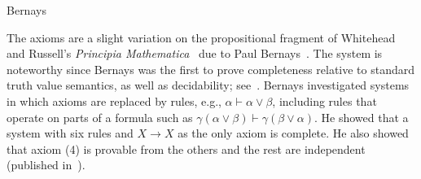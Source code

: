 \begin{entry}{Bernays}
\begin{history}
  The axioms are a slight variation on the propositional fragment of Whitehead and
  Russell's \emph{Principia Mathematica}~ due to
  Paul Bernays~\cite{Bernays1918}.  The system is noteworthy since Bernays was the
  first to prove completeness relative to standard truth value semantics, as well
  as decidability; see~\cite{Zach1999}. Bernays investigated systems in which
  axioms are replaced by rules, e.g., $\alpha \vdash \alpha \lor \beta$, including
  rules that operate on parts of a formula such as $\gamma(\alpha \lor \beta)
  \vdash \gamma(\beta \lor \alpha)$. He showed that a system with six rules and $X
  \rightarrow X$ as the only axiom is complete. He also showed that axiom (4) is
  provable from the others and the rest are independent (published
  in~\cite{Bernays1926}).  
\end{history}


\end{entry}

